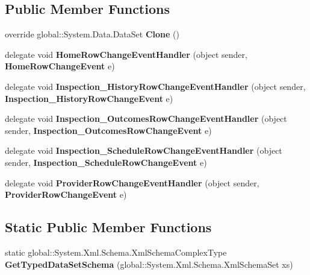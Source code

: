 \subsection*{Public Member Functions}
\begin{DoxyCompactItemize}
\item 
\mbox{\label{class_a_f_h___scheduler_1_1_home_inspection_db_data_set_a20af861dc76727a90ac665375445109c}} 
override global\+::\+System.\+Data.\+Data\+Set {\bfseries Clone} ()
\item 
\mbox{\label{class_a_f_h___scheduler_1_1_home_inspection_db_data_set_abd1a9a363b6f61832fcf5b84ccbd3426}} 
delegate void {\bfseries Home\+Row\+Change\+Event\+Handler} (object sender, \textbf{ Home\+Row\+Change\+Event} e)
\item 
\mbox{\label{class_a_f_h___scheduler_1_1_home_inspection_db_data_set_ab4ccbaa4afb8d09d682a12a55b1a954f}} 
delegate void {\bfseries Inspection\+\_\+\+History\+Row\+Change\+Event\+Handler} (object sender, \textbf{ Inspection\+\_\+\+History\+Row\+Change\+Event} e)
\item 
\mbox{\label{class_a_f_h___scheduler_1_1_home_inspection_db_data_set_abe91b8cff20b1c611c8fae8c5dea22b9}} 
delegate void {\bfseries Inspection\+\_\+\+Outcomes\+Row\+Change\+Event\+Handler} (object sender, \textbf{ Inspection\+\_\+\+Outcomes\+Row\+Change\+Event} e)
\item 
\mbox{\label{class_a_f_h___scheduler_1_1_home_inspection_db_data_set_aa187ec5bc660cd0c9a40d1f2ac9069bf}} 
delegate void {\bfseries Inspection\+\_\+\+Schedule\+Row\+Change\+Event\+Handler} (object sender, \textbf{ Inspection\+\_\+\+Schedule\+Row\+Change\+Event} e)
\item 
\mbox{\label{class_a_f_h___scheduler_1_1_home_inspection_db_data_set_aac58837c1fa3a730a183587cea1e4a17}} 
delegate void {\bfseries Provider\+Row\+Change\+Event\+Handler} (object sender, \textbf{ Provider\+Row\+Change\+Event} e)
\end{DoxyCompactItemize}
\subsection*{Static Public Member Functions}
\begin{DoxyCompactItemize}
\item 
\mbox{\label{class_a_f_h___scheduler_1_1_home_inspection_db_data_set_ac180a952a4dfe4d39d03adc8d04c74a7}} 
static global\+::\+System.\+Xml.\+Schema.\+Xml\+Schema\+Complex\+Type {\bfseries Get\+Typed\+Data\+Set\+Schema} (global\+::\+System.\+Xml.\+Schema.\+Xml\+Schema\+Set xs)
\end{DoxyCompactItemize}
